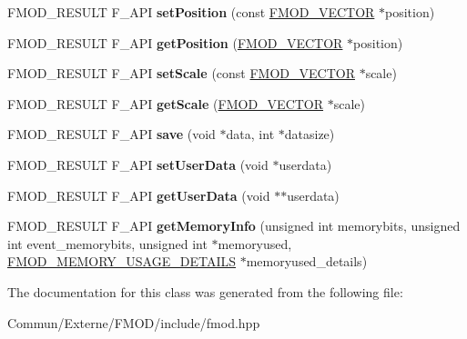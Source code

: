 \begin{DoxyCompactItemize}
\item 
F\+M\+O\+D\+\_\+\+R\+E\+S\+U\+LT F\+\_\+\+A\+PI {\bfseries set\+Position} (const \hyperlink{struct_f_m_o_d___v_e_c_t_o_r}{F\+M\+O\+D\+\_\+\+V\+E\+C\+T\+OR} $\ast$position)\hypertarget{class_f_m_o_d_1_1_geometry_a36ca90c62cbc0c37938a51750ce865e7}{}\label{class_f_m_o_d_1_1_geometry_a36ca90c62cbc0c37938a51750ce865e7}

\item 
F\+M\+O\+D\+\_\+\+R\+E\+S\+U\+LT F\+\_\+\+A\+PI {\bfseries get\+Position} (\hyperlink{struct_f_m_o_d___v_e_c_t_o_r}{F\+M\+O\+D\+\_\+\+V\+E\+C\+T\+OR} $\ast$position)\hypertarget{class_f_m_o_d_1_1_geometry_a2d0e4a6525b54cd9a39c447995eba296}{}\label{class_f_m_o_d_1_1_geometry_a2d0e4a6525b54cd9a39c447995eba296}

\item 
F\+M\+O\+D\+\_\+\+R\+E\+S\+U\+LT F\+\_\+\+A\+PI {\bfseries set\+Scale} (const \hyperlink{struct_f_m_o_d___v_e_c_t_o_r}{F\+M\+O\+D\+\_\+\+V\+E\+C\+T\+OR} $\ast$scale)\hypertarget{class_f_m_o_d_1_1_geometry_a46104dceeff4a02e5aae989f86951b2f}{}\label{class_f_m_o_d_1_1_geometry_a46104dceeff4a02e5aae989f86951b2f}

\item 
F\+M\+O\+D\+\_\+\+R\+E\+S\+U\+LT F\+\_\+\+A\+PI {\bfseries get\+Scale} (\hyperlink{struct_f_m_o_d___v_e_c_t_o_r}{F\+M\+O\+D\+\_\+\+V\+E\+C\+T\+OR} $\ast$scale)\hypertarget{class_f_m_o_d_1_1_geometry_a40f45f30258de49daf8bee7063afa9e9}{}\label{class_f_m_o_d_1_1_geometry_a40f45f30258de49daf8bee7063afa9e9}

\item 
F\+M\+O\+D\+\_\+\+R\+E\+S\+U\+LT F\+\_\+\+A\+PI {\bfseries save} (void $\ast$data, int $\ast$datasize)\hypertarget{class_f_m_o_d_1_1_geometry_a066a05c012e2d41f1ca929ab0328aa25}{}\label{class_f_m_o_d_1_1_geometry_a066a05c012e2d41f1ca929ab0328aa25}

\item 
F\+M\+O\+D\+\_\+\+R\+E\+S\+U\+LT F\+\_\+\+A\+PI {\bfseries set\+User\+Data} (void $\ast$userdata)\hypertarget{class_f_m_o_d_1_1_geometry_a9e7359878a030cf144cfdd773dfce85a}{}\label{class_f_m_o_d_1_1_geometry_a9e7359878a030cf144cfdd773dfce85a}

\item 
F\+M\+O\+D\+\_\+\+R\+E\+S\+U\+LT F\+\_\+\+A\+PI {\bfseries get\+User\+Data} (void $\ast$$\ast$userdata)\hypertarget{class_f_m_o_d_1_1_geometry_ab8502126a540d836f0fee179f2310c8f}{}\label{class_f_m_o_d_1_1_geometry_ab8502126a540d836f0fee179f2310c8f}

\item 
F\+M\+O\+D\+\_\+\+R\+E\+S\+U\+LT F\+\_\+\+A\+PI {\bfseries get\+Memory\+Info} (unsigned int memorybits, unsigned int event\+\_\+memorybits, unsigned int $\ast$memoryused, \hyperlink{struct_f_m_o_d___m_e_m_o_r_y___u_s_a_g_e___d_e_t_a_i_l_s}{F\+M\+O\+D\+\_\+\+M\+E\+M\+O\+R\+Y\+\_\+\+U\+S\+A\+G\+E\+\_\+\+D\+E\+T\+A\+I\+LS} $\ast$memoryused\+\_\+details)\hypertarget{class_f_m_o_d_1_1_geometry_a3dd06bc4077fac782ed5487c347ff14d}{}\label{class_f_m_o_d_1_1_geometry_a3dd06bc4077fac782ed5487c347ff14d}

\end{DoxyCompactItemize}


The documentation for this class was generated from the following file\+:\begin{DoxyCompactItemize}
\item 
Commun/\+Externe/\+F\+M\+O\+D/include/fmod.\+hpp\end{DoxyCompactItemize}
